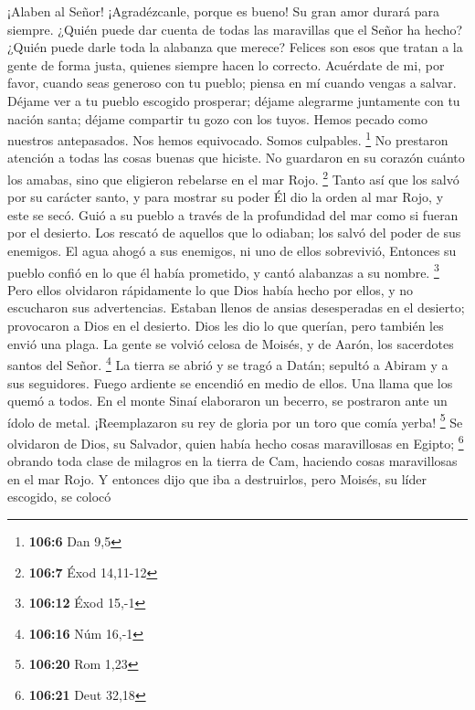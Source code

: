  ¡Alaben al Señor! ¡Agradézcanle, porque es bueno! Su gran
amor durará para siempre.  ¿Quién puede dar cuenta de todas
las maravillas que el Señor ha hecho? ¿Quién puede darle toda la
alabanza que merece?  Felices son esos que tratan a la gente
de forma justa, quienes siempre hacen lo correcto. 
Acuérdate de mi, por favor, cuando seas generoso con tu pueblo; piensa
en mí cuando vengas a salvar.  Déjame ver a tu pueblo
escogido prosperar; déjame alegrarme juntamente con tu nación santa;
déjame compartir tu gozo con los tuyos.  Hemos pecado como
nuestros antepasados. Nos hemos equivocado. Somos culpables. \footnote{\textbf{106:6}
  Dan 9,5}  No prestaron atención a todas las cosas buenas
que hiciste. No guardaron en su corazón cuánto los amabas, sino que
eligieron rebelarse en el mar Rojo. \footnote{\textbf{106:7} Éxod
  14,11-12}  Tanto así que los salvó por su carácter santo,
y para mostrar su poder  Él dio la orden al mar Rojo, y este
se secó. Guió a su pueblo a través de la profundidad del mar como si
fueran por el desierto.  Los rescató de aquellos que lo
odiaban; los salvó del poder de sus enemigos.  El agua
ahogó a sus enemigos, ni uno de ellos sobrevivió,  Entonces
su pueblo confió en lo que él había prometido, y cantó alabanzas a su
nombre. \footnote{\textbf{106:12} Éxod 15,-1}  Pero ellos
olvidaron rápidamente lo que Dios había hecho por ellos, y no escucharon
sus advertencias.  Estaban llenos de ansias desesperadas en
el desierto; provocaron a Dios en el desierto.  Dios les
dio lo que querían, pero también les envió una plaga.  La
gente se volvió celosa de Moisés, y de Aarón, los sacerdotes santos del
Señor. \footnote{\textbf{106:16} Núm 16,-1}  La tierra se
abrió y se tragó a Datán; sepultó a Abiram y a sus seguidores.
 Fuego ardiente se encendió en medio de ellos. Una llama
que los quemó a todos.  En el monte Sinaí elaboraron un
becerro, se postraron ante un ídolo de metal. 
¡Reemplazaron su rey de gloria por un toro que comía yerba! \footnote{\textbf{106:20}
  Rom 1,23}  Se olvidaron de Dios, su Salvador, quien había
hecho cosas maravillosas en Egipto; \footnote{\textbf{106:21} Deut 32,18}
 obrando toda clase de milagros en la tierra de Cam,
haciendo cosas maravillosas en el mar Rojo.  Y entonces
dijo que iba a destruirlos, pero Moisés, su líder escogido, se colocó

